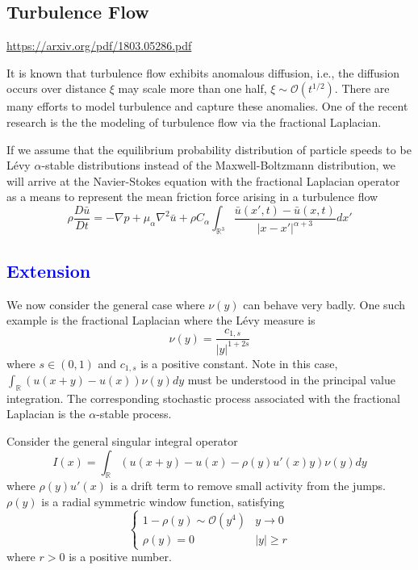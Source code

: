 \documentclass[10pt,a4paper]{article}
\newcommand{\RR}[0]{\mathbb{R}}
\newcommand{\lib}[1]{\subsection*{\textcolor{blue}{#1}}}
\theoremstyle{definition}
\begin{document}
\subsection{Turbulence Flow}

\url{https://arxiv.org/pdf/1803.05286.pdf}

It is known that turbulence flow exhibits anomalous diffusion, i.e., the diffusion occurs over distance $\xi$ may scale more than one half, $\xi\sim\mathcal{O}(t^{1/2})$. There are many efforts to model turbulence and capture these anomalies. One of the recent research is the the modeling of turbulence flow via the fractional Laplacian. 

If we assume that the equilibrium probability distribution of particle speeds to be L\'evy $\alpha$-stable distributions instead of the Maxwell-Boltzmann distribution, we will arrive at the Navier-Stokes equation with the fractional Laplacian operator as a means to represent the mean friction force arising in a turbulence flow
\begin{equation}
	\rho\frac{D\bar u}{Dt} = -\nabla p + \mu_\alpha \nabla^2 \bar u + \rho C_\alpha \int_{\RR^3} \frac{\bar u(x',t)-\bar u(x,t)}{|x-x'|^{\alpha+3}} dx'
\end{equation}



\lib{Extension}

We now consider the general case where $\nu(y)$ can behave very badly. One such example is the fractional Laplacian where the L\'evy measure is 
\begin{equation}
	\nu(y) = \frac{c_{1,s}}{|y|^{1+2s}}
\end{equation}
where $s\in (0,1)$ and $c_{1,s}$ is a positive constant. Note in this case, $\int_{\RR}(u(x+y)-u(x))\nu(y)dy$ must be understood in the principal value integration. The corresponding stochastic process associated with the fractional Laplacian is the $\alpha$-stable process. 

Consider the general singular integral operator
\begin{equation}\label{equ:Ix}
	I(x) = \int_{\RR}(u(x+y)-u(x)-\rho(y)u'(x)y)\nu(y)dy
\end{equation}
where $\rho(y)u'(x)$ is a drift term to remove small activity from the jumps. $\rho(y)$ is a radial symmetric window function, satisfying
\begin{equation}\label{equ:rho_condition}
\begin{cases}
	1-\rho(y)\sim \mathcal{O}(y^4)& y\rightarrow 0\\
	\rho(y)=0 & |y|\geq r
\end{cases}
\end{equation}
where $r>0$ is a positive number. 
\end{document}
